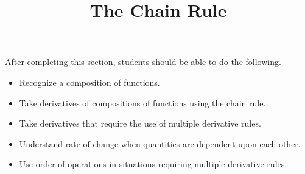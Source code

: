 \documentclass{ximera}
\title{The Chain Rule}
\begin{document}
\begin{abstract}
\end{abstract}

\maketitle

\begin{sectionOutcomes}

After completing this section, students should be able to do the following.

\begin{itemize}
	\item Recognize a composition of functions.
	\item Take derivatives of compositions of functions using the chain rule.
	\item Take derivatives that require the use of multiple derivative rules.
	\item Understand rate of change when quantities are dependent upon each other.
	\item Use order of operations in situations requiring multiple derivative rules.
\end{itemize}

\end{sectionOutcomes}
\end{document}
